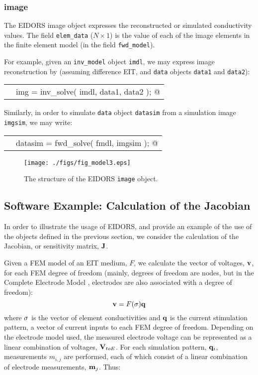 \documentclass[12pt]{iopart}
\makeatletter
\newcommand{\CODEstart}{\medskip\begin{tabular}{ll}}
\newcommand{\CN}{\tt\scriptsize} %
\newcommand{\CC}{&\small\verb@}   % start code
\newcommand{\CODEend}{\end{tabular}\medskip}
\makeatother
\begin{document}
\subsubsection{image}

The EIDORS image object expresses the reconstructed or
simulated conductivity values. The field {\tt elem\_data}
($N\times1$) is the value of each of the image elements in 
the finite element model (in the field {\tt fwd\_model}).

For example, given
an {\tt inv\_model} object {\tt imdl}, we may express
image reconstruction by (assuming
difference EIT, and {\tt data} objects {\tt data1} and {\tt data2}):

\CODEstart
\CN    \CC img = inv_solve( imdl, data1, data2 ); @\\[-3pt]
\CODEend

Similarly, in order to simulate {\tt data} object {\tt datasim}
from a simulation image {\tt imgsim}, we may write:

\CODEstart
\CN    \CC datasim = fwd_solve( fmdl, imgsim ); @\\[-3pt]
\CODEend

%
%
\begin{figure}[th]
\begin{flushright}
\texttt{[image: ./figs/fig\_model3.eps]}
\caption{\small The structure of the EIDORS {\tt image} object.
\label{fig:image}
 }
\end{flushright}
\end{figure}


\subsection{Software Example: Calculation of the Jacobian}

In order to illustrate the usage of EIDORS, and provide
an example of the use of the objects defined in the previous
section, we consider
the calculation of the Jacobian, or sensitivity matrix,
$\bf J$.

Given a FEM  model of an EIT medium,
$F$, we calculate the vector of voltages, $\bf v$, 
for each FEM degree of freedom
 (mainly, degrees of freedom are nodes, but in the
 Complete Electrode Model \cite{Cheng_etal_1989},
 electrodes are also associated
 with a degree of freedom):
\begin{equation}
{\bf v} = F({\bf \sigma}){\bf q} 
\end{equation}
where $\bf \sigma$ is the vector of element conductivities
and $\bf q$ is the current stimulation pattern, a vector
of current inputs to each FEM degree of freedom.
Depending on the electrode model used, the measured electrode
voltage can be represented as a linear combination of 
voltages, ${\bf V}_{toE}$.
For each simulation pattern, ${\bf q}_{i}$,
measurements $m_{i,j}$
are performed, each of which consist of a linear combination of
electrode measurements, ${\bf m}_j$.
Thus:
\end{document}
